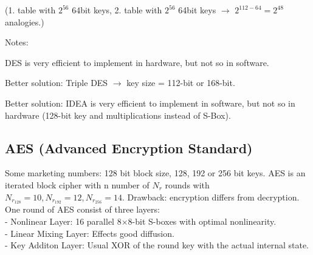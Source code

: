 \begin{minipage}{10cm}
\begin{aufzaehlung}
    (1. table with $2^{56}$ 64bit keys, 2. table with $2^{56}$ 64bit keys $\to$ $2^{112-64} = 2^{48}$ analogies.)\\
\end{aufzaehlung}
Notes:
\begin{liste}
	\item DES is very efficient to implement in hardware, but not so in software.
  \item Better solution: Triple DES $\to$ key size = 112-bit or 168-bit.
  \item Better solution: IDEA is very efficient to implement in software, but not so in hardware (128-bit key and multiplications instead of S-Box).
\end{liste}


\subsection{AES (Advanced Encryption Standard)}
Some marketing numbers: 128 bit block size, 128, 192 or 256 bit keys. AES is an iterated block cipher with n number of $N_r$ rounds
with $N_{r_{128}}=10, N_{r_{192}}=12, N_{r_{256}}=14$. Drawback: encryption differs from decryption.\\
One round of AES consist of three layers:\\
- Nonlinear Layer: 16 parallel 8$\times$8-bit S-boxes with optimal nonlinearity.\\
- Linear Mixing Layer: Effects good diffusion.\\
- Key Additon Layer: Usual XOR of the round key with the actual internal state.\\

\end{minipage}
\hspace{5mm}
